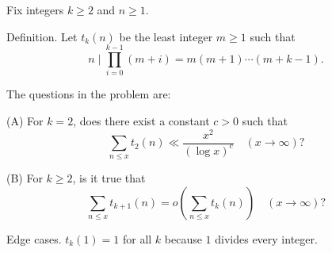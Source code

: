 Fix integers $k\ge 2$ and $n\ge 1$.

Definition.
Let $t_k(n)$ be the least integer $m\ge 1$ such that
\[
 n\mid \prod_{i=0}^{k-1} (m+i)=m(m+1)\cdots (m+k-1).
\]

The questions in the problem are:

(A) For $k=2$, does there exist a constant $c>0$ such that
\[
\sum_{n\le x} t_2(n) \ll \frac{x^2}{(\log x)^c}\quad (x\to\infty)?
\]

(B) For $k\ge 2$, is it true that
\[
\sum_{n\le x} t_{k+1}(n) = o\!\left(\sum_{n\le x} t_k(n)\right)\quad (x\to\infty)?
\]

Edge cases.
$t_k(1)=1$ for all $k$ because $1$ divides every integer.
